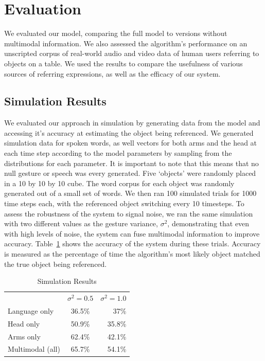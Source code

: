 \documentclass[a4paper, 11pt]{article} %
\begin{document}
\section{Evaluation}
We evaluated our model, comparing the full model to versions without multimodal information. We also assessed the algorithm's performance on an unscripted corpus of real-world audio and video data of human users referring to objects on a table. We used the results to compare the usefulness of various sources of referring expressions, as well as the efficacy of our system.
\subsection{Simulation Results}
We evaluated our approach in simulation by generating data from the model and accessing it's accuracy at estimating the object being referenced. We generated simulation data for spoken words, as well vectors for both arms and the head at each time step according to the model parameters by sampling from the distributions for each parameter. It is important to note that this means that no null gesture or speech was every generated. Five `objects' were randomly placed in a 10 by 10 by 10 cube. The word corpus for each object was randomly generated out of a small set of words. We then ran 100 simulated trials for 1000 time steps each, with the referenced object switching every 10 timesteps. To assess the robustness of the system to signal noise, we ran the same simulation with two different values as the gesture variance, $\sigma^2$, demonstrating that even with high levels of noise, the system can fuse multimodal information to improve accuracy. Table~\ref{table:sim_results} shows the accuracy of the system during these trials. Accuracy is measured as the percentage of time the algorithm's most likely object matched the true object being referenced.
\begin{table}[h]
\centering
\caption{Simulation Results\label{table:sim_results}}
\begin{tabular}{lcr}
\toprule
& $\sigma^2 = 0.5$ & $\sigma^2 = 1.0$\\
Language only &  36.5\% & 37\%\\
Head only & 50.9\% & 35.8\%\\
Arms only & 62.4\% & 42.1\%\\
Multimodal (all)&  65.7\% & 54.1\%\\
\bottomrule
\end{tabular}
\end{table}
\end{document}

